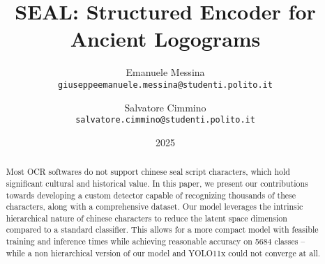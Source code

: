 \documentclass[10pt,twocolumn,letterpaper]{article}
\begin{document}
\title{SEAL: Structured Encoder for Ancient Logograms}
\date{2025}

\author{Emanuele Messina\\
{\tt\small giuseppeemanuele.messina@studenti.polito.it}
\and
Salvatore Cimmino\\
{\tt\small salvatore.cimmino@studenti.polito.it}
}

\maketitle

\begin{abstract}
  Most OCR softwares do not support chinese seal script characters, which hold significant cultural and historical value. In this paper, we present our contributions towards developing a custom detector capable of recognizing thousands of these characters, along with a comprehensive dataset. Our model leverages the intrinsic hierarchical nature of chinese characters to reduce the latent space dimension compared to a standard classifier. This allows for a more compact model with feasible training and inference times while achieving reasonable accuracy on 5684 classes -- while a non hierarchical version of our model and YOLO11x could not converge at all.
\end{abstract}








{\small
  
  
}
\end{document}
